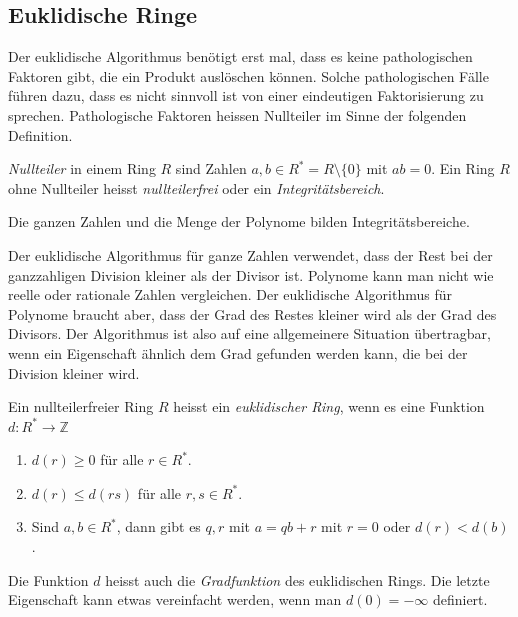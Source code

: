 %
%
%
\subsection{Euklidische Ringe
\label{buch:ratint:euklid:subsection:ringe}}
Der euklidische Algorithmus benötigt erst mal, dass es keine
pathologischen Faktoren gibt, die ein Produkt auslöschen können.
Solche pathologischen Fälle führen dazu, dass es nicht sinnvoll ist
von einer eindeutigen Faktorisierung zu sprechen.
Pathologische Faktoren heissen Nullteiler im Sinne der folgenden
Definition.

\begin{definition}
\emph{Nullteiler} in einem Ring $R$ sind Zahlen
$a,b\in R^*=R\setminus\{0\}$ mit $ab=0$.
Ein Ring $R$ ohne Nullteiler heisst \emph{nullteilerfrei} oder ein
\emph{Integritätsbereich}.
%
%
%
\end{definition}

Die ganzen Zahlen und die Menge der Polynome bilden Integritätsbereiche.

Der euklidische Algorithmus für ganze Zahlen verwendet, dass der Rest
bei der ganzzahligen Division kleiner als der Divisor ist.
Polynome kann man nicht wie reelle oder rationale Zahlen vergleichen.
Der euklidische Algorithmus für Polynome braucht aber, dass der Grad
des Restes kleiner wird als der Grad des Divisors.
Der Algorithmus ist also auf eine allgemeinere Situation übertragbar,
wenn ein Eigenschaft ähnlich dem Grad gefunden werden kann, die bei
der Division kleiner wird.

\begin{definition}
\label{buch:ratint:euklid:def:euklidischerring}
Ein nullteilerfreier Ring  $R$ heisst ein \emph{euklidischer Ring},
%
%
wenn es eine Funktion $d\colon R^*\to\mathbb{Z}$
\begin{enumerate}
\item $d(r) \ge 0$ für alle $r\in R^*$.
\item $d(r)\le d(rs)$ für alle $r,s\in R^*$.
\item Sind $a,b\in R^*$, dann gibt es $q,r$ mit $a=qb+r$ mit $r=0$ oder
$d(r)<d(b)$.
\end{enumerate}
Die Funktion $d$ heisst auch die \emph{Gradfunktion} des euklidischen
Rings.
%
Die letzte Eigenschaft kann etwas vereinfacht werden, wenn man
$d(0)=-\infty$ definiert.
\end{definition}

